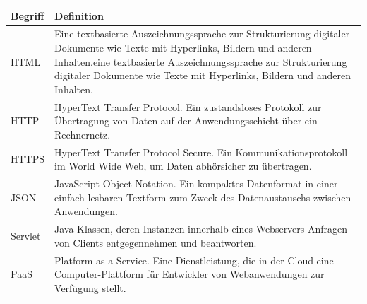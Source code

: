 \documentclass[]{report}
\begin{document}
\begin{longtable}[]{@{}ll@{}}
\toprule
\begin{minipage}[b]{0.31\columnwidth}\raggedright\strut
Begriff\strut
\end{minipage} & \begin{minipage}[b]{0.63\columnwidth}\raggedright\strut
Definition\strut
\end{minipage}\tabularnewline
\midrule
\endhead
\begin{minipage}[t]{0.31\columnwidth}\raggedright\strut
HTML
\end{minipage} & \begin{minipage}[t]{0.63\columnwidth}\raggedright\strut
Eine textbasierte Auszeichnungssprache zur Strukturierung digitaler Dokumente wie Texte mit Hyperlinks, Bildern und anderen Inhalten.eine textbasierte Auszeichnungssprache zur Strukturierung digitaler Dokumente wie Texte mit Hyperlinks, Bildern und anderen Inhalten.
\end{minipage}\tabularnewline
\begin{minipage}[t]{0.31\columnwidth}\raggedright\strut
HTTP
\end{minipage} & \begin{minipage}[t]{0.63\columnwidth}\raggedright\strut
HyperText Transfer Protocol. Ein zustandsloses Protokoll zur Übertragung von Daten auf der Anwendungsschicht über ein Rechnernetz.
\end{minipage}\tabularnewline
\begin{minipage}[t]{0.31\columnwidth}\raggedright\strut
HTTPS
\end{minipage} & \begin{minipage}[t]{0.63\columnwidth}\raggedright\strut
HyperText Transfer Protocol Secure. Ein Kommunikationsprotokoll im World Wide Web, um Daten abhörsicher zu übertragen.
\end{minipage}\tabularnewline
\begin{minipage}[t]{0.31\columnwidth}\raggedright\strut
JSON
\end{minipage} & \begin{minipage}[t]{0.63\columnwidth}\raggedright\strut
JavaScript Object Notation. Ein kompaktes Datenformat in einer einfach lesbaren Textform zum Zweck des Datenaustauschs zwischen Anwendungen.
\end{minipage}\tabularnewline
\begin{minipage}[t]{0.31\columnwidth}\raggedright\strut
Servlet
\end{minipage} & \begin{minipage}[t]{0.63\columnwidth}\raggedright\strut
Java-Klassen, deren Instanzen innerhalb eines Webservers Anfragen von Clients entgegennehmen und beantworten.
\end{minipage}\tabularnewline
\begin{minipage}[t]{0.31\columnwidth}\raggedright\strut
PaaS
\end{minipage} & \begin{minipage}[t]{0.63\columnwidth}\raggedright\strut
Platform as a Service. Eine Dienstleistung, die in der Cloud eine Computer-Plattform für Entwickler von Webanwendungen zur Verfügung stellt.
\end{minipage}\tabularnewline
\bottomrule
\end{longtable}
\end{document}
